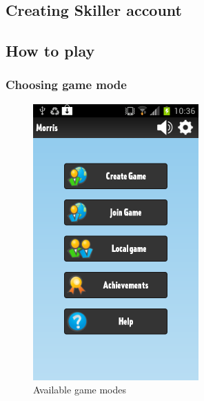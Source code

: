 \subsection{Creating Skiller account}

\subsection{How to play}

\subsubsection{Choosing game mode}
\label{section:game_mode}
\begin{figure}[H]
\begin{center}
    \includegraphics[height=300pt]{Images/menuPage}
\end{center}
\caption{Available game modes}
\label{fig:gameMode}
\end{figure}

